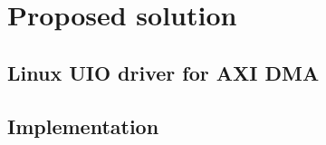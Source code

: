 
\chapter{Proposed solution }
\label{cha:proposed solution }


\section{Linux UIO driver for AXI DMA}
\label{sec:Linux UIO driver for AXI DMA}


\section{Implementation}
\label{sec:Implementation}




